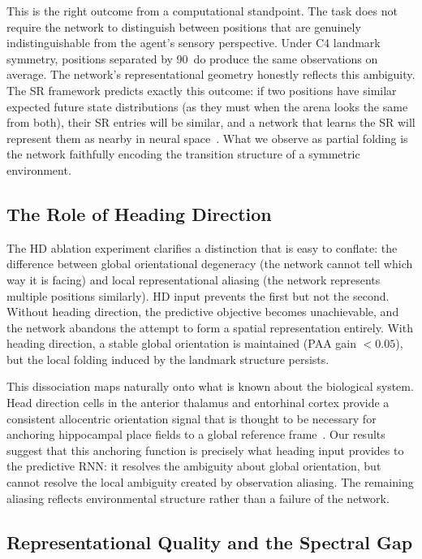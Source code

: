 \documentclass[11pt, a4paper]{article}
\begin{document}
This is the right outcome from a computational standpoint. The task does
not require the network to distinguish between positions that are
genuinely indistinguishable from the agent's sensory perspective. Under
C4 landmark symmetry, positions separated by 90\degree~do produce the
same observations on average. The network's representational geometry
honestly reflects this ambiguity. The SR framework predicts exactly this
outcome: if two positions have similar expected future state distributions
(as they must when the arena looks the same from both), their SR entries
will be similar, and a network that learns the SR will represent them as
nearby in neural space~\citep{stachenfeld2017}. What we observe as partial
folding is the network faithfully encoding the transition structure of a
symmetric environment.

\subsection{The Role of Heading Direction}

The HD ablation experiment clarifies a distinction that is easy to
conflate: the difference between global orientational degeneracy (the
network cannot tell which way it is facing) and local representational
aliasing (the network represents multiple positions similarly). HD input
prevents the first but not the second. Without heading direction, the
predictive objective becomes unachievable, and the network abandons the
attempt to form a spatial representation entirely. With heading direction,
a stable global orientation is maintained (PAA gain $< 0.05$), but the
local folding induced by the landmark structure persists.

This dissociation maps naturally onto what is known about the biological
system. Head direction cells in the anterior thalamus and entorhinal cortex
provide a consistent allocentric orientation signal that is thought to be
necessary for anchoring hippocampal place fields to a global reference
frame~\citep{lever2002}. Our results suggest that this anchoring function
is precisely what heading input provides to the predictive RNN: it resolves
the ambiguity about global orientation, but cannot resolve the local
ambiguity created by observation aliasing. The remaining
aliasing reflects environmental structure rather than a failure of the
network.

\subsection{Representational Quality and the Spectral Gap}
\end{document}
